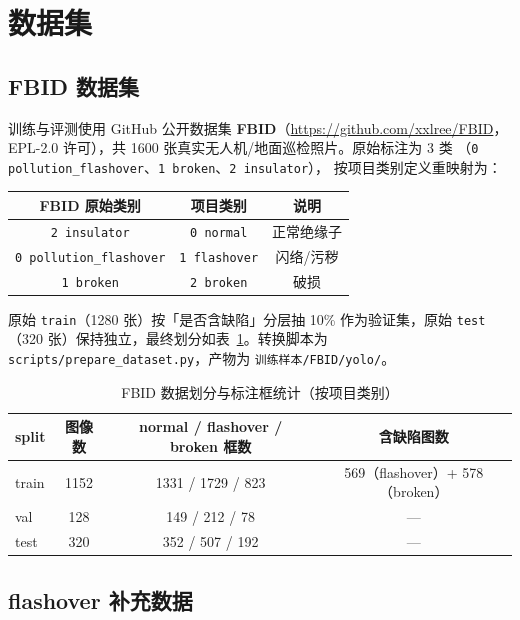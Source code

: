 \documentclass[UTF8,a4paper,11pt]{ctexart}
\begin{document}
\section{数据集}

\subsection{FBID 数据集}

训练与评测使用 GitHub 公开数据集 \textbf{FBID}（\url{https://github.com/xxlree/FBID}，
EPL-2.0 许可），共 1600 张真实无人机/地面巡检照片。原始标注为 3 类
（\texttt{0 pollution\_flashover}、\texttt{1 broken}、\texttt{2 insulator}），
按项目类别定义重映射为：

\begin{center}
\begin{tabular}{ccc}
\toprule
FBID 原始类别 & 项目类别 & 说明 \\
\midrule
\texttt{2 insulator} & \texttt{0 normal} & 正常绝缘子 \\
\texttt{0 pollution\_flashover} & \texttt{1 flashover} & 闪络/污秽 \\
\texttt{1 broken} & \texttt{2 broken} & 破损 \\
\bottomrule
\end{tabular}
\end{center}

原始 \texttt{train}（1280 张）按「是否含缺陷」分层抽 10\% 作为验证集，原始 \texttt{test}
（320 张）保持独立，最终划分如表~\ref{tab:data}。转换脚本为
\texttt{scripts/prepare\_dataset.py}，产物为 \texttt{训练样本/FBID/yolo/}。

\begin{table}[htbp]
\centering
\caption{FBID 数据划分与标注框统计（按项目类别）}
\label{tab:data}
\begin{tabular}{lccc}
\toprule
split & 图像数 & normal / flashover / broken 框数 & 含缺陷图数 \\
\midrule
train & 1152 & 1331 / 1729 / 823 & 569（flashover）+ 578（broken） \\
val   & 128  & 149 / 212 / 78   & --- \\
test  & 320  & 352 / 507 / 192  & --- \\
\bottomrule
\end{tabular}
\end{table}

\subsection{flashover 补充数据}
\end{document}
